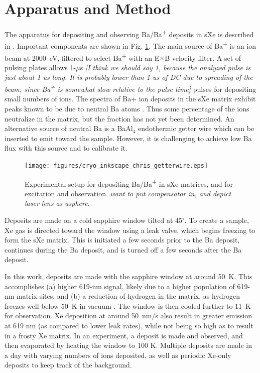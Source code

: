 \documentclass[aps,pra,reprint,superscriptaddress]{revtex4-1}
\begin{document}
\section{Apparatus and Method}

The apparatus for depositing and observing Ba/Ba\textsuperscript{+} deposits in sXe is described in \cite{Mong2015}.  Important components are shown in Fig. \ref{fig:apparatus}.  The main source of Ba\textsuperscript{+} is an ion beam at 2000~eV, filtered to select Ba\textsuperscript{+} with an E$\times$B velocity filter.  A set of pulsing plates allows 1-$\mu$s {\color{gray}\emph{[I think we should say 1, because the analyzed pulse is just about 1 us long. It is probably lower than 1 us of DC due to spreading of the beam, since Ba\textsuperscript{+} is somewhat slow relative to the pulse time]}} pulses for depositing small numbers of ions.  The spectra of Ba+ ion deposits in the sXe matrix exhibit peaks known to be due to neutral Ba atoms \cite{Mong2015}.  Thus some percentage of the ions neutralize in the matrix, but the fraction has not yet been determined.  An alternative source of neutral Ba is a BaAl$_{4}$ endothermic getter wire which can be inserted to emit toward the sample.  However, it is challenging to achieve low Ba flux with this source and to calibrate it.

\begin{figure}
\texttt{[image: figures/cryo\_inkscape\_chris\_getterwire.eps]}
\caption{Experimental setup for depositing Ba/Ba\textsuperscript{+} in sXe matrices, and for excitation and observation.  {\color{gray}\emph{want to put compensator in, and depict laser lens as asphere.}}}
\label{fig:apparatus}
\end{figure}

Deposits are made on a cold sapphire window tilted at 45$^{\circ}$.  To create a sample, Xe gas is directed toward the window using a leak valve, which begins freezing to form the sXe matrix.  This is initiated a few seconds prior to the Ba deposit, continues during the Ba deposit, and is turned off a few seconds after the Ba deposit.

In this work, deposits are made with the sapphire window at around 50~K. This accomplishes (a) higher 619-nm signal, likely due to a higher population of 619-nm matrix sites, and (b) a reduction of hydrogen in the matrix, as hydrogen freezes well below 50~K in vacuum \cite{Mong2015}.  The window is then cooled further to 11~K for observation.  Xe deposition at around {\color{blue}50~nm/s} also result in greater emission at 619 nm (as compared to lower leak rates), while not being so high as to result in a frosty Xe matrix.  In an experiment, a deposit is made and observed, and then evaporated by heating the window to 100 K.  Multiple deposits are made in a day with varying numbers of ions deposited, as well as periodic Xe-only deposits to keep track of the background.
\end{document}

